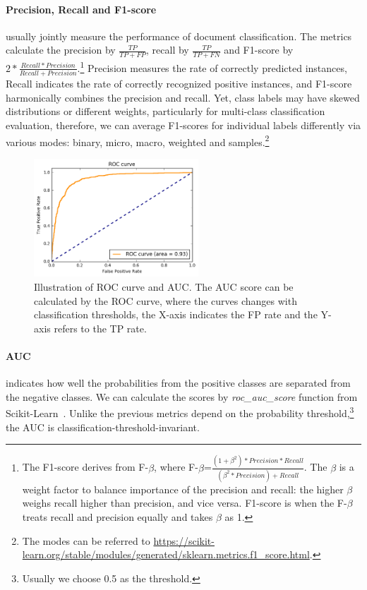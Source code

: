 \paragraph{Precision, Recall and F1-score} usually jointly measure the performance of document classification. The metrics calculate the precision by $\frac{TP}{TP+FP}$, recall by $\frac{TP}{TP+FN}$ and F1-score by $2*\frac{Recall*Precision}{Recall+Precision}$.\footnote{The F1-score derives from F-$\beta$, where F-$\beta$=$\frac{(1+\beta^2)*Precision*Recall}{(\beta^2*Precision)+Recall}$. The $\beta$ is a weight factor to balance importance of the precision and recall: the higher $\beta$ weighs recall higher than precision, and vice versa. F1-score is when the F-$\beta$ treats recall and precision equally and takes $\beta$ as 1.}
Precision measures the rate of correctly predicted instances, Recall indicates the rate of correctly recognized positive instances, and F1-score harmonically combines the precision and recall.
Yet, class labels may have skewed distributions or different weights, particularly for multi-class classification evaluation, therefore, we can average F1-scores for individual labels differently via various modes: binary, micro, macro, weighted and samples.\footnote{The modes can be referred to \url{https://scikit-learn.org/stable/modules/generated/sklearn.metrics.f1_score.html}.}


\begin{figure}[tb!]
\centering
\includegraphics[width=0.55\textwidth]{images/chapter2/roc-curve.png}
\caption{Illustration of ROC curve and AUC. The AUC score can be calculated by the ROC curve, where the curves changes with classification thresholds, the X-axis indicates the FP rate and the Y-axis refers to the TP rate.}
\label{chap2:fig:roc}
\end{figure}

\paragraph{AUC} indicates how well the probabilities from the positive classes are separated from the negative classes. 
We can calculate the scores by \textit{roc\_auc\_score} function from Scikit-Learn~\cite{pedregosa2011scikit}.
Unlike the previous metrics depend on the probability threshold,\footnote{Usually we choose 0.5 as the threshold.} the AUC is classification-threshold-invariant.


